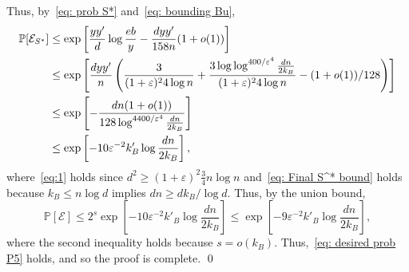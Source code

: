 \documentclass[11pt]{article}
\newcommand{\eps}{\varepsilon}
\def\P{\mathbb P}
\theoremstyle{plain}
\begin{document}
Thus, by~\eqref{eq: prob S*} and~\eqref{eq: bounding Bu}, 
\begin{align}
    \P[\mathcal E_{S^*}] &\leq \exp\left[\frac{yy'}{d}\log\frac{eb}{y} - \frac{dyy'}{158n}(1 + o(1))\right]\notag\\
    &\leq\exp\left[\frac{dyy'}{n}\left(\frac{3}{(1 + \eps)^24\log n} + \frac{3\log\log^{400/\eps^4}\frac{dn}{2k_B}}{(1 + \eps)^24\log n} - (1 + o(1))/128\right)\right]\label{eq:1}\\
    &\leq \exp\left[-\frac{dn(1 + o(1))}{128\log^{4400/\eps^4}\frac{dn}{2k_B}}\right]\notag\\
    &\leq \exp\left[-10\eps^{-2}k'_B\log\frac{dn}{2k_B}\right]\label{eq: Final S^* bound},
\end{align}
where~\eqref{eq:1} holds since $d^2 \geq (1 + \eps)^2\frac{3}{4} n\log n$ and~\eqref{eq: Final S^* bound} holds because $k_B \leq n\log d$ implies $dn \geq dk_B/\log d$. Thus, by the union bound, 
\[
\P[\mathcal E] \leq 2^s\exp\left[-10\eps^{-2}k'_B\log\frac{dn}{2k_B}\right] \leq \exp\left[-9\eps^{-2}k'_B\log\frac{dn}{2k_B}\right],
\]
where the second inequality holds because $s = o(k_B)$. Thus,~\eqref{eq: desired prob P5} holds, and so the proof is complete.
\qed
\end{document}
